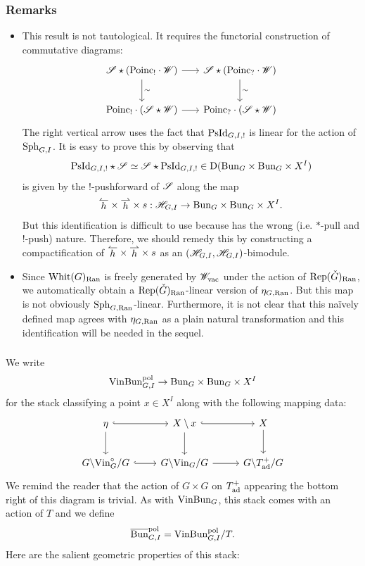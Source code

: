 \subsubsection{Remarks}
\begin{itemize}
    \item[(i)] This result is not tautological. It requires the functorial construction of commutative diagrams:
\[
\begin{tikzcd}[
  column sep={10em,between origins},
  row sep={4em,between origins}
]
  \SS \star ( \Poinc_! \cdot \WW) \arrow[r] \arrow[d, "\sim"] & \SS \star (\Poinc_? \cdot \WW) \arrow[d, "\sim"] \\
  \Poinc_! \cdot (\SS \star \WW) \arrow[r] & \Poinc_? \cdot (\SS \star \WW)
\end{tikzcd}
\]
The right vertical arrow uses the fact that $\mathrm{PsId}_{G,I,!}$ is linear for the action of $\mathrm{Sph}_{G,I}$. It is easy to prove this by observing that 
\[
    \mathrm{PsId}_{G,I,!} \star \mathscr{S} \simeq \mathscr{S} \star \mathrm{PsId}_{G,I,!} \in \mathrm{D}(\mathrm{Bun}_G \times \mathrm{Bun}_G \times X^I)
\]
is given by the $!$-pushforward of $\mathscr{S}$ along the map
  \[\hl \times \hr \times s : \HH_{G,I} \to \Bun_G \times \Bun_G \times X^I.\]
But this identification is difficult to use because has the wrong (i.e. $*$-pull and $!$-push) nature. Therefore, we should remedy this by constructing a compactification of $\hl \times \hr \times s$ as an $(\mathscr{H}_{G, I}, \mathscr{H}_{G,I})$-bimodule.
    \item[(ii)] Since $\mathrm{Whit}(G)_{\mathrm{Ran}}$ is freely generated by $\mathscr{W}_{\mathrm{vac}}$ under the action of $\mathrm{Rep}({\check{G}})_{\mathrm{Ran}}$, we automatically obtain a $\mathrm{Rep}({\check{G}})_{\mathrm{Ran}}$-linear version of $\eta_{G,\mathrm{Ran}}$. But this map is not obviously $\mathrm{Sph}_{G, \mathrm{Ran}}$-linear. Furthermore, it is not clear that this na\"ively defined map agrees with $\eta_{G,\mathrm{Ran}}$ as a plain natural transformation and this identification will be needed in the sequel.
\end{itemize}

\subsubsection{} We write
  \[\mathrm{Vin}\mathrm{Bun}_{G,I}^{\mathrm{pol}} \to \mathrm{Bun}_G \times \mathrm{Bun}_G \times X^I\]
for the stack classifying a point $x \in X^I$ along with the following mapping data:
\[
\begin{tikzcd}[
  column sep={8em,between origins},
  row sep={4em,between origins}
]
  \eta \arrow[r, hook] \arrow[d] & X \setminus x \arrow[r, hook] \arrow[d] & X \arrow[d] \\ 
  G \bs \Vin^\circ_G / G \arrow[r, hook] & G \bs \Vin_G / G \arrow[r] & G \bs T_\ad^+ / G
\end{tikzcd}
\]
We remind the reader that the action of $G \times G$ on $T_{\mathrm{ad}}^+$ appearing the bottom right of this diagram is trivial. As with $\mathrm{Vin}\mathrm{Bun}_G$, this stack comes with an action of $T$ and we define
  \[\overline{\mathrm{Bun}}_{G,I}^{\mathrm{pol}} = \mathrm{Vin}\mathrm{Bun}_{G,I}^{\mathrm{pol}} / T.\]
Here are the salient geometric properties of this stack:

